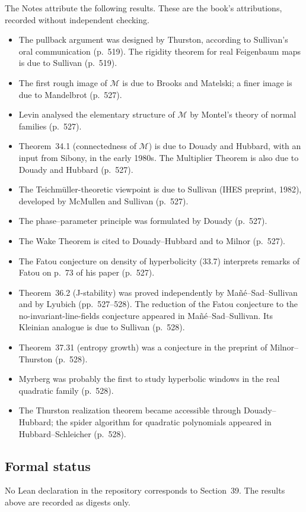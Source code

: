 The Notes attribute the following results.  These are the book's attributions, recorded without
independent checking.

\begin{itemize}
\item The pullback argument was designed by Thurston, according to Sullivan's oral communication (p.~519).
  The rigidity theorem for real Feigenbaum maps is due to Sullivan (p.~519).
\item The first rough image of $\mathcal M$ is due to Brooks and Matelski; a finer image is due to Mandelbrot (p.~527).
\item Levin analysed the elementary structure of $\mathcal M$ by Montel's theory of normal families (p.~527).
\item Theorem~34.1 (connectedness of $\mathcal M$) is due to Douady and Hubbard, with an input from Sibony, in the
  early 1980s.  The Multiplier Theorem is also due to Douady and Hubbard (p.~527).
\item The Teichm\"uller-theoretic viewpoint is due to Sullivan (IHES preprint, 1982), developed by McMullen and
  Sullivan (p.~527).
\item The phase--parameter principle was formulated by Douady (p.~527).
\item The Wake Theorem is cited to Douady--Hubbard and to Milnor (p.~527).
\item The Fatou conjecture on density of hyperbolicity (33.7) interprets remarks of Fatou on p.~73 of his paper (p.~527).
\item Theorem~36.2 (J-stability) was proved independently by Ma\~n\'e--Sad--Sullivan and by Lyubich (pp.~527--528).
  The reduction of the Fatou conjecture to the no-invariant-line-fields conjecture appeared in Ma\~n\'e--Sad--Sullivan.
  Its Kleinian analogue is due to Sullivan (p.~528).
\item Theorem~37.31 (entropy growth) was a conjecture in the preprint of Milnor--Thurston (p.~528).
\item Myrberg was probably the first to study hyperbolic windows in the real quadratic family (p.~528).
\item The Thurston realization theorem became accessible through Douady--Hubbard; the spider algorithm for
  quadratic polynomials appeared in Hubbard--Schleicher (p.~528).
\end{itemize}

\subsection*{Formal status}

No Lean declaration in the repository corresponds to Section~39.  The results above are recorded as digests only.
